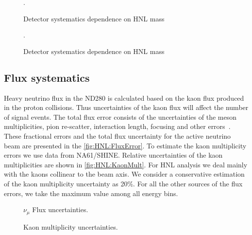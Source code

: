 \documentclass[../main.tex]{subfiles}
\begin{document}
\begin{figure}[!ht]
  \begin{minipage}{0.49\linewidth}
  \end{minipage}
  \begin{minipage}{0.49\linewidth}
  \end{minipage}
  \caption{Detector systematics dependence on HNL mass}.
  \label{fig:HNL:sys}
\end{figure}

\begin{figure}[!ht]
  \caption{Detector systematics dependence on HNL mass}.
  \label{fig:HNL:sysDimuon}
\end{figure}


\subsection{Flux systematics}

Heavy neutrino flux in the ND280 is calculated based on the kaon flux produced in the proton collisions. Thus uncertainties of the kaon flux will affect the number of signal events. The total flux error consists of the uncertainties of the meson multiplicities, pion re-scatter, interaction length, focusing and other errors~\cite{Abe2013}. These fractional errors and the total flux uncertainty for the active neutrino beam are presented in the \autoref{fig:HNL:FluxError}. To estimate the kaon multiplicity errors we use data from NA61/SHINE. Relative uncertainties of the kaon multiplicities are shown in \autoref{fig:HNL:KaonMult}. For HNL analysis we deal mainly with the kaons collinear to the beam axis. We consider a conservative estimation of the kaon multiplicity uncertainty as 20\%. For all the other sources of the flux errors, we take the maximum value among all energy bins.

\begin{figure}[!ht]
\begin{minipage}{0.49\linewidth}
  \caption{$\nu_\mu$ Flux uncertainties.}
  \label{fig:HNL:FluxError}
\end{minipage}
\hfill
\begin{minipage}{0.49\linewidth}
  \caption{Kaon multiplicity uncertainties.}
  \label{fig:HNL:KaonMult}
\end{minipage}
\end{figure}
\end{document}
